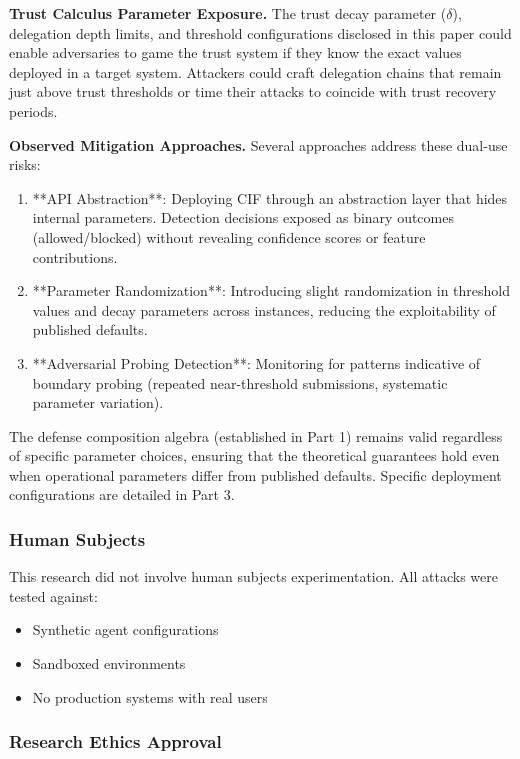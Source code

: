 \documentclass[
]{article}
\begin{document}
\textbf{Trust Calculus Parameter Exposure.} The trust decay parameter
(\(\delta\)), delegation depth limits, and threshold configurations
disclosed in this paper could enable adversaries to game the trust
system if they know the exact values deployed in a target system.
Attackers could craft delegation chains that remain just above trust
thresholds or time their attacks to coincide with trust recovery
periods.

\textbf{Observed Mitigation Approaches.} Several approaches address
these dual-use risks:

\begin{enumerate}
\item **API Abstraction**: Deploying CIF through an abstraction layer that hides internal parameters. Detection decisions exposed as binary outcomes (allowed/blocked) without revealing confidence scores or feature contributions.
\item **Parameter Randomization**: Introducing slight randomization in threshold values and decay parameters across instances, reducing the exploitability of published defaults.
\item **Adversarial Probing Detection**: Monitoring for patterns indicative of boundary probing (repeated near-threshold submissions, systematic parameter variation).
\end{enumerate}

The defense composition algebra (established in Part 1) remains valid
regardless of specific parameter choices, ensuring that the theoretical
guarantees hold even when operational parameters differ from published
defaults. Specific deployment configurations are detailed in Part 3.

\subsubsection{Human Subjects}\label{sec:human-subjects}

This research did not involve human subjects experimentation. All
attacks were tested against:

\begin{itemize}
\item Synthetic agent configurations
\item Sandboxed environments
\item No production systems with real users
\end{itemize}

\subsubsection{Research Ethics Approval}\label{sec:ethics-approval}
\end{document}
